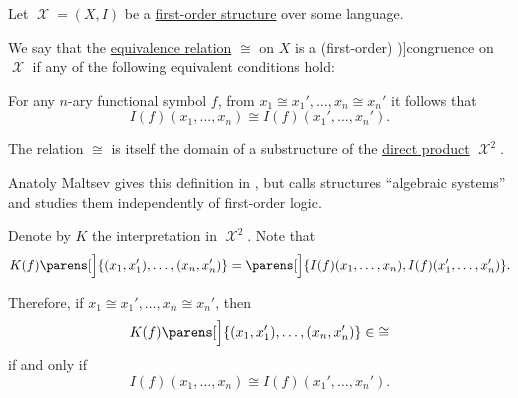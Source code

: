 \begin{definition}\label{def:first_order_congruence}
  Let \( \mscrX = (X, I) \) be a \hyperref[def:first_order_structure]{first-order structure} over some language.

  We say that the \hyperref[def:equivalence_relation]{equivalence relation} \( \cong \) on \( X \) is a (first-order) \term[ru=конгруэнция (\cite[46]{Мальцев1970})]{congruence} on \( \mscrX \) if any of the following equivalent conditions hold:
  \begin{thmenum}
     For any \( n \)-ary functional symbol \( f \), from \( x_1 \cong x_1', \ldots, x_n \cong x_n' \) it follows that
    \begin{equation}\label{eq:def:first_order_congruence/direct}
      I(f)(x_1, \ldots, x_n) \cong I(f)(x_1', \ldots, x_n').
    \end{equation}

     The relation \( \cong \) is itself the domain of a substructure of the \hyperref[def:first_order_direct_product]{direct product} \( \mscrX^2 \).
  \end{thmenum}
\end{definition}
\begin{comments}
  \item Anatoly Maltsev gives this definition in \cite[46]{Мальцев1970}, but calls structures \enquote{algebraic systems} and studies them independently of first-order logic.
\end{comments}
\begin{defproof}
   Denote by \( K \) the interpretation in \( \mscrX^2 \). Note that
  \begin{equation*}
    K(f)\parens[\Big]{ (x_1, x_1'), \ldots, (x_n, x_n') }
    =
    \parens[\Big]{ I(f)(x_1, \ldots, x_n), I(f)(x_1', \ldots, x_n') }.
  \end{equation*}

  Therefore, if \( x_1 \cong x_1', \ldots, x_n \cong x_n' \), then
  \begin{equation*}
    K(f)\parens[\Big]{ (x_1, x_1'), \ldots, (x_n, x_n') } \in {\cong}
  \end{equation*}
  if and only if
  \begin{equation*}
    I(f)(x_1, \ldots, x_n) \cong I(f)(x_1', \ldots, x_n').
  \end{equation*}
\end{defproof}

